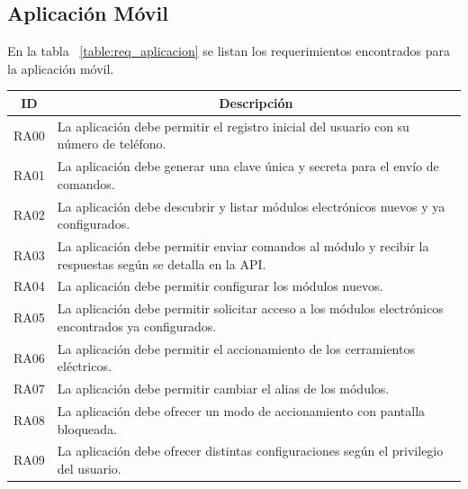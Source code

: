 \subsection{Aplicación Móvil}
En la tabla ~\ref{table:req_aplicacion} se listan los requerimientos encontrados para la aplicación móvil.
\begin{table}[ht]
	\begin{tabular}{|l|m{12cm}|}
		\hline
		\multicolumn{1}{|c|}{\textbf{ID}} & \multicolumn{1}{c|}{\textbf{Descripción}}                                                                 \\ \hline
		RA00                              & La aplicación debe permitir el registro inicial del usuario con su número de teléfono.                    \\ \hline
		RA01                              & La aplicación debe generar una clave única y secreta para el envío de comandos.                           \\ \hline
		RA02                              & La aplicación debe descubrir y listar módulos electrónicos nuevos y ya configurados.                      \\ \hline
		RA03                              & La aplicación debe permitir enviar comandos al módulo y recibir la respuestas según se detalla en la API. \\ \hline
		RA04                              & La aplicación debe permitir configurar los módulos nuevos.                                                \\ \hline
		RA05                              & La aplicación debe permitir solicitar acceso a los módulos electrónicos encontrados ya configurados.      \\ \hline
		RA06                              & La aplicación debe permitir el accionamiento de los cerramientos eléctricos.                              \\ \hline
		RA07                              & La aplicación debe permitir cambiar el alias de los módulos.                                              \\ \hline
		RA08                              & La aplicación debe ofrecer un modo de accionamiento con pantalla bloqueada.                               \\ \hline
		RA09                              & La aplicación debe ofrecer distintas configuraciones según el privilegio del usuario.                     \\ \hline

\end{tabular}
\end{table}
